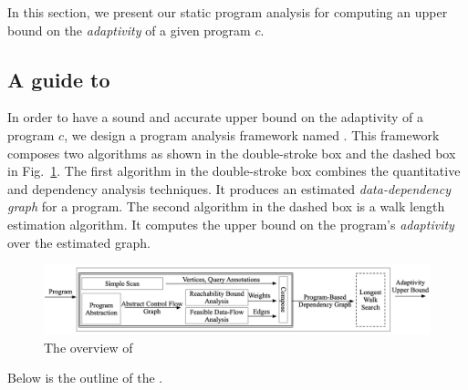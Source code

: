 In this section, we present our static program analysis for computing an upper bound on the \emph{adaptivity} of a given program $c$. 
%
\subsection{A guide to {\THESYSTEM} }
In order to have a sound and accurate upper bound on the  adaptivity of a program $c$,
we design a program analysis framework named {\THESYSTEM}.
This framework composes two algorithms as shown in the double-stroke box and the dashed box in Fig.~\ref{fig:adaptfun}.
The first algorithm in the double-stroke box combines the quantitative and dependency analysis techniques.
It produces an estimated \emph{data-dependency graph} for a program.
The second algorithm in the dashed box is a walk length estimation algorithm.
It computes the upper bound on the program's \emph{adaptivity} over the estimated graph.
\begin{figure}
  \centering    
\includegraphics[width=1.0\columnwidth]{adapfun.png}
  \vspace{-0.3cm}
  \caption{The overview of {\THESYSTEM}}
  \label{fig:adaptfun}
  \vspace{-0.5cm}
\end{figure}
%
Below is the outline of the {\THESYSTEM}.
